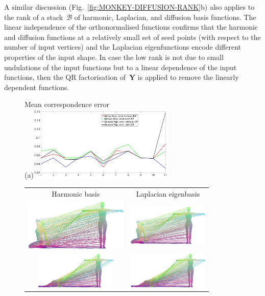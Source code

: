 \documentclass[acmtog,authorversion]{acmart}
\begin{document}
A similar discussion (Fig.~\ref{fig:MONKEY-DIFFUSION-RANK}b) also applies to the rank of a stack~$\mathcal{B}$ of harmonic, Laplacian, and diffusion basis functions. The linear independence of the orthonormalised functions confirms that the harmonic and diffusion functions at a relatively small set of seed points (with respect to the number of input vertices) and the Laplacian eigenfunctions encode different properties of the input shape. In case the low rank is not due to small undulations of the input functions but to a linear dependence of the input functions, then the QR factorisation of~$\mathbf{Y}$ is applied to remove the linearly dependent functions.
%
\begin{figure}[t]
\centering
Mean correspondence error\\
(a)\includegraphics[height=100pt]{FMAP-images/victoria7-STATISTICS-2.jpg}
\begin{tabular}{c|c}
\hline
Harmonic basis &Laplacian eigenbasis\\
\includegraphics[width=140pt]{FMAP-images/Source=victoria0-Target=victoria23-General-Basis-ZOOM.jpg}
&\includegraphics[width=110pt]{FMAP-images/Source=victoria0-Target=victoria23-Lapl-Eig-ZOOM.jpg}\\
\includegraphics[width=110pt]{FMAP-images/Source=victoria0-Target=victoria24-General-Basis-ZOOM.jpg}
&\includegraphics[width=110pt]{FMAP-images/Source=victoria0-Target=victoria24-Lapl-Eig-ZOOM.jpg}\\

\end{tabular}
\end{figure}
\end{document}
